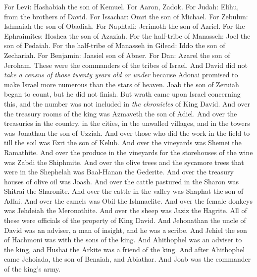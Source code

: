 \begin{biblechapter}
\verse For Levi: Hashabiah the son of Kemuel. For Aaron, Zadok.
\verse For Judah: Elihu, from the brothers of David. For Issachar: Omri the son of Michael.
\verse For Zebulun: Ishmaiah the son of Obadiah. For Naphtali: Jerimoth the son of Azriel.
\verse For the Ephraimites: Hoshea the son of Azaziah. For the half-tribe of Manasseh: Joel the son of Pedaiah.
\verse For the half-tribe of Manasseh in Gilead: Iddo the son of Zechariah. For Benjamin: Jaasiel son of Abner.
\verse For Dan: Azarel the son of Jeroham. These were the commanders of the tribes of Israel.
\verse And David did not \textit{take a census of those twenty years old or under} because Adonai promised to make Israel more numerous than the stars of heaven.
\verse Joab the son of Zeruiah began to count, but he did not finish. But wrath came upon Israel concerning this, and the number was not included in \textit{the chronicles} of King David.
\verse And over the treasury rooms of the king was Azmaveth the son of Adiel. And over the treasuries in the country, in the cities, in the unwalled villages, and in the towers was Jonathan the son of Uzziah.
\verse And over those who did the work in the field to till the soil was Ezri the son of Kelub.
\verse And over the vineyards was Shemei the Ramathite. And over the produce in the vineyards for the storehouses of the wine was Zabdi the Shiphmite.
\verse And over the olive trees and the sycamore trees that were in the Shephelah was Baal-Hanan the Gederite. And over the treasury houses of olive oil was Joash.
\verse And over the cattle pastured in the Sharon was Shitrai the Sharonite. And over the cattle in the valley was Shaphat the son of Adlai.
\verse And over the camels was Obil the Ishmaelite. And over the female donkeys was Jehdeiah the Meronothite. And over the sheep was Jaziz the Hagrite.
\verse All of these were officials of the property of King David.
\verse And Jehonathan the uncle of David was an adviser, a man of insight, and he was a scribe. And Jehiel the son of Hachmoni was with the sons of the king.
\verse And Ahithophel was an adviser to the king, and Hushai the Arkite was a friend of the king.
\verse And after Ahithophel came Jehoiada, the son of Benaiah, and Abiathar. And Joab was the commander of the king’s army.
\end{biblechapter}


